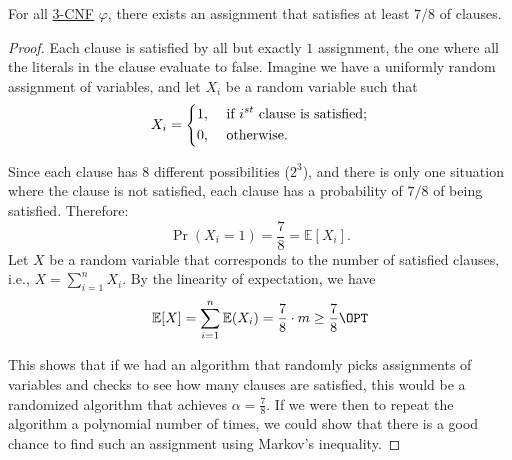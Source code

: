 \begin{lemma}\label{lma:random-max-3SAT}
	For all \hyperref[def:k-CNF]{3-CNF} \(\varphi\), there exists an assignment that satisfies at least \(7 / 8\) of clauses.
\end{lemma}
\begin{proof}
	Each clause is satisfied by all but exactly \(1\) assignment, the one where all the literals in the clause evaluate to false. Imagine we have a uniformly random assignment of variables, and let \(X_i\) be a random variable such that
	\[
		X_i = \begin{dcases}
			1, & \text{ if \(i^{st} \) clause is satisfied}  ; \\
			0, & \text{ otherwise}.
		\end{dcases}
	\]

	Since each clause has \(8\) different possibilities (\(2^3\)), and there is only one situation where the clause is not satisfied, each clause has a probability of \(7 / 8\) of being satisfied. Therefore:
	\[
		\Pr(X_i = 1) = \frac{7}{8} = \mathbb{E}[X_i].
	\]
	Let \(X\) be a random variable that corresponds to the number of satisfied clauses, i.e., \(X = \sum_{i=1}^n X_i\).  By the linearity of expectation, we have
	\[
		\mathbb{E}[X] = \sum_{i=1}^n \mathbb{E}(X_i) = \frac{7}{8} \cdot m \geq \frac{7}{8}\OPT
	\]

	This shows that if we had an algorithm that randomly picks assignments of variables and checks to see how many clauses are satisfied, this would be a randomized algorithm that achieves \(\alpha = \frac{7}{8}\). If we were then to repeat the algorithm a polynomial number of times, we could show that there is a good chance to find such an assignment using Markov's inequality.
\end{proof}